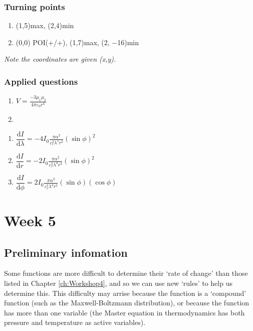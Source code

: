 \documentclass[
]{book}
\providecommand{\tightlist}{%
  \setlength{\itemsep}{0pt}\setlength{\parskip}{0pt}}
\begin{document}
\hypertarget{turning-points-1}{%
\subsection{Turning points}\label{turning-points-1}}

\begin{enumerate}
\def\labelenumi{\arabic{enumi}.}
\tightlist
\item
  (1,5)max, (2,4)min
\item
  (0,0) POI(+/+), (1,7)max, (2, −16)min
\end{enumerate}

\emph{Note the coordinates are given (x,y).}

\hypertarget{applied-questions-1}{%
\subsection{Applied questions}\label{applied-questions-1}}

\begin{enumerate}
\def\labelenumi{\arabic{enumi}.}
\item
  \(V = \frac{-3 \mu_1 \mu_2}{4 \pi \varepsilon_0 r^4}\)
\item
\end{enumerate}

\begin{enumerate}
\def\labelenumi{\alph{enumi}.}
\tightlist
\item
  \(\dfrac{\textrm{d}I}{\textrm{d}\lambda}= -4I_0 \frac{\pi \alpha ^2}{\varepsilon _r^2 \lambda^5 r^2}(\sin \phi)^2\)
\item
  \(\dfrac{\textrm{d}I}{\textrm{d}r}= -2I_0 \frac{\pi \alpha ^2}{\varepsilon _r^2 \lambda^4 r^3}(\sin \phi)^2\)
\item
  \(\dfrac{\textrm{d}I}{\textrm{d}\phi}= 2I_0 \frac{\pi \alpha ^2}{\varepsilon _r^2 \lambda^4 r^2}(\sin \phi)(\cos \phi)\)
\end{enumerate}

\hypertarget{ch:Workshop5}{%
\chapter{Week 5}\label{ch:Workshop5}}

\hypertarget{sec:Prelim5}{%
\section{Preliminary infomation}\label{sec:Prelim5}}

Some functions are more difficult to determine their `rate of change' than those listed in Chapter \ref{ch:Workshop4}, and so we can use new `rules' to help us determine this. This difficulty may arrise because the function is a `compound' function (such as the Maxwell-Boltzmann distribution), or because the function has more than one variable (the Master equation in thermodynamics has both pressure and temperature as active variables).
\end{document}
